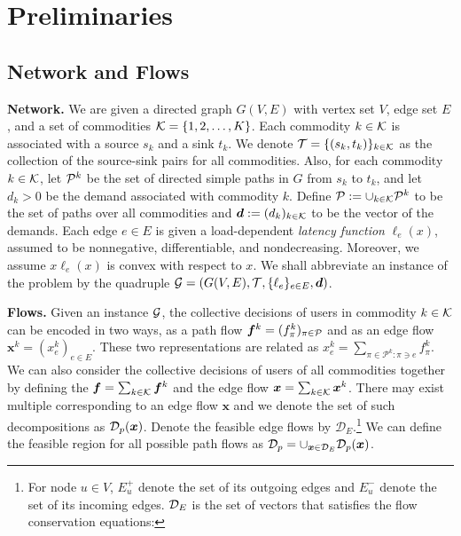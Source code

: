 \section{Preliminaries}\label{sec:prelim}
\subsection{Network and Flows}
\textbf{Network.} We are given a directed graph $G(V,E)$ with vertex set $V$, edge set $E$, and a set of commodities %
$\mathcal{K}=\{1,2,\dots,K\}$.  Each commodity $k \in \mathcal{K}$ is associated with a source $s_k$ and a sink $t_k$.  We denote $\mathcal{T} = \{(s_k,t_k)\}_{k \in \mathcal{K}}$ as the collection of the source-sink pairs for all commodities.
Also, for each commodity $k \in \mathcal{K}$, let $\mathcal{P}^k$ be the set of directed simple paths in $G$ from $s_k$ to $t_k$, and let $d_k > 0$ be the demand associated with commodity $k$. Define $\mathcal{P}:=\cup_{k \in \mathcal{K}}\mathcal{P}^k$ to be the set of paths over all commodities and $\bm{d}:=(d_k)_{k \in \mathcal{K}}$ to be the vector of the demands. Each edge $e \in E$ is given a load-dependent \emph{latency function} $\ell_e(x)$, assumed to be nonnegative, differentiable, and nondecreasing. Moreover, we assume $x \ell_e(x)$ is convex with respect to $x$.  We shall abbreviate an instance of the problem by the quadruple $\mathcal{G}=(G(V,E),\mathcal{T}, 
\{\ell_e\}_{e\in E}, \bm{d})$.


\smallskip\noindent\textbf{Flows.} Given an instance $\mathcal{G}$, the collective decisions of users in commodity $k \in \mathcal{K}$ can be encoded in two ways, as a path flow $\bm{f}^k=(f_{\pi}^k)_{\pi \in \mathcal{P}}$ and as an edge flow $\bm{x}^k = (x_e^k)_{e\in E}$. These two representations are related as $x_e^k = \sum_{\pi \in \mathcal{P}^k:\pi \owns e} f_{\pi}^k$. We can also consider the collective decisions of users of all commodities together by defining the {\pathdecomp} $\bm{f} = \sum_{k \in \mathcal{K}} \bm{f}^k$ and the edge flow $\bm{x} = \sum_{k \in \mathcal{K}} \bm{x}^k$.
There may exist multiple {\pathdecomps} corresponding to an edge flow $\bm{x}$ and we denote the set of such decompositions as $\mathcal{D}_p(\bm{x})$. Denote the feasible edge flows by $\mathcal{D}_E.$\footnote{
For node $u\in V$, $E_u^+$ denote the set of its outgoing edges and $E_u^-$ denote the set of its incoming edges.  $\mathcal{D}_E$ is the set of vectors that satisfies the flow conservation equations:
}
We can define the feasible region for all possible path flows as $\mathcal{D}_p = \cup_{\bm{x} \in \mathcal{D}_E} \mathcal{D}_p(\bm{x})$.
  
